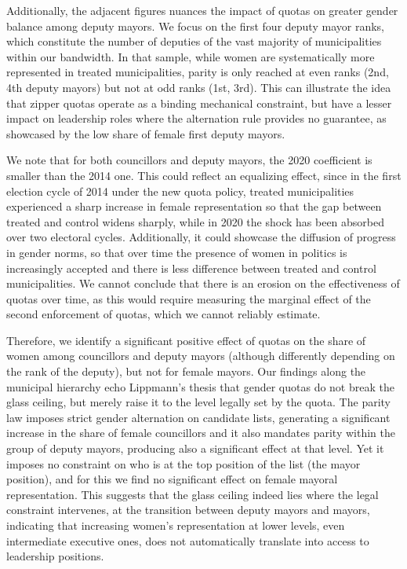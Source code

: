 \documentclass[11pt,a4paper]{article}
\begin{document}
Additionally, the adjacent figures nuances the impact of quotas on greater gender balance among deputy mayors. We focus on the first four deputy mayor ranks, which constitute the number of deputies of the vast majority of municipalities within our bandwidth. In that sample, while women are systematically more represented in treated municipalities, parity is only reached at even ranks (2nd, 4th deputy mayors) but not at odd ranks (1st, 3rd). This can illustrate the idea that zipper quotas operate as a binding mechanical constraint, but have a lesser impact on leadership roles where the alternation rule provides no guarantee, as showcased by the low share of female first deputy mayors.

We note that for both councillors and deputy mayors, the 2020 coefficient is smaller than the 2014 one. This could reflect an equalizing effect, since in the first election cycle of 2014 under the new quota policy, treated municipalities experienced a sharp increase in female representation so that the gap between treated and control widens sharply, while in 2020 the shock has been absorbed over two electoral cycles. Additionally, it could showcase the diffusion of progress in gender norms, so that over time the presence of women in politics is increasingly accepted and there is less difference between treated and control municipalities. We cannot conclude that there is an erosion on the effectiveness of quotas over time, as this would require measuring the marginal effect of the second enforcement of quotas, which we cannot reliably estimate.

Therefore, we identify a significant positive effect of quotas on the share of women among councillors and deputy mayors (although differently depending on the rank of the deputy), but not for female mayors. Our findings along the municipal hierarchy echo Lippmann's thesis that gender quotas do not break the glass ceiling, but merely raise it to the level legally set by the quota. The parity law imposes strict gender alternation on candidate lists, generating a significant increase in the share of female councillors and it also mandates parity within the group of deputy mayors, producing also a significant effect at that level. Yet it imposes no constraint on who is at the top position of the list (the mayor position), and for this we find no significant effect on female mayoral representation. This suggests that the glass ceiling indeed lies where the legal constraint intervenes, at the transition between deputy mayors and mayors, indicating that increasing women's representation at lower levels, even intermediate executive ones, does not automatically translate into access to leadership positions.
\end{document}
